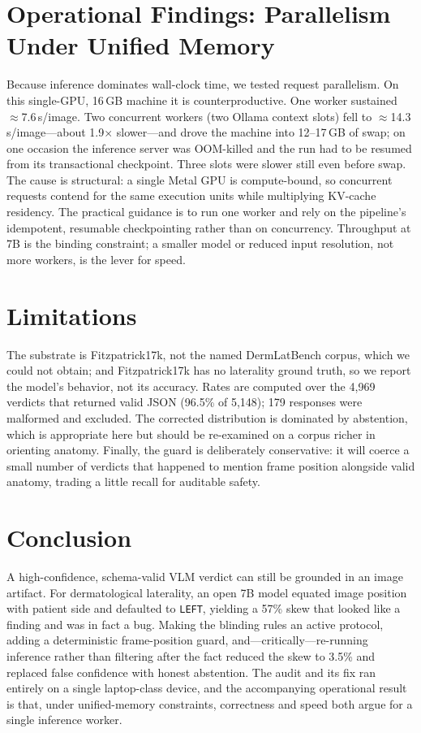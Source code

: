 \documentclass[conference]{IEEEtran}
\begin{document}
\section{Operational Findings: Parallelism Under Unified Memory}\label{sec:ops}
Because inference dominates wall-clock time, we tested request parallelism. On this single-GPU, 16\,GB machine it is counterproductive. One worker sustained $\approx$7.6\,s/image. Two concurrent workers (two Ollama context slots) fell to $\approx$14.3\,s/image---about 1.9$\times$ slower---and drove the machine into 12--17\,GB of swap; on one occasion the inference server was OOM-killed and the run had to be resumed from its transactional checkpoint. Three slots were slower still even before swap. The cause is structural: a single Metal GPU is compute-bound, so concurrent requests contend for the same execution units while multiplying KV-cache residency. The practical guidance is to run one worker and rely on the pipeline's idempotent, resumable checkpointing rather than on concurrency. Throughput at 7B is the binding constraint; a smaller model or reduced input resolution, not more workers, is the lever for speed.

\section{Limitations}
The substrate is Fitzpatrick17k, not the named DermLatBench corpus, which we could not obtain; and Fitzpatrick17k has no laterality ground truth, so we report the model's behavior, not its accuracy. Rates are computed over the 4{,}969 verdicts that returned valid JSON (96.5\% of 5{,}148); 179 responses were malformed and excluded. The corrected distribution is dominated by abstention, which is appropriate here but should be re-examined on a corpus richer in orienting anatomy. Finally, the guard is deliberately conservative: it will coerce a small number of verdicts that happened to mention frame position alongside valid anatomy, trading a little recall for auditable safety.

\section{Conclusion}
A high-confidence, schema-valid VLM verdict can still be grounded in an image artifact. For dermatological laterality, an open 7B model equated image position with patient side and defaulted to \texttt{LEFT}, yielding a 57\% skew that looked like a finding and was in fact a bug. Making the blinding rules an active protocol, adding a deterministic frame-position guard, and---critically---re-running inference rather than filtering after the fact reduced the skew to 3.5\% and replaced false confidence with honest abstention. The audit and its fix ran entirely on a single laptop-class device, and the accompanying operational result is that, under unified-memory constraints, correctness and speed both argue for a single inference worker.
\end{document}
